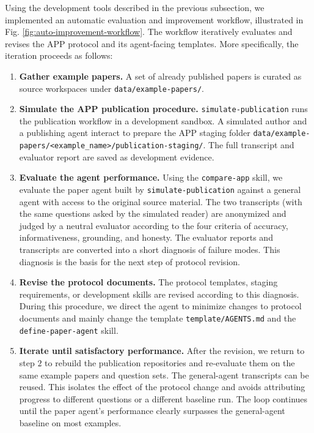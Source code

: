 \documentclass{article}
\begin{document}
Using the development tools described in the previous subsection, we implemented an automatic evaluation and improvement workflow, illustrated in Fig. \ref{fig:auto-improvement-workflow}. The workflow iteratively evaluates and revises the APP protocol and its agent-facing templates. More specifically, the iteration proceeds as follows:

\begin{enumerate}
    \item \textbf{Gather example papers.} A set of already published papers is curated as source workspaces under \texttt{data/example-papers/}. 
    \item \textbf{Simulate the APP publication procedure.} \texttt{simulate-publication} runs the publication workflow in a development sandbox. A simulated author and a publishing agent interact to prepare the APP staging folder \texttt{data/example-papers/<example\_name>/publication-staging/}. The full transcript and evaluator report are saved as development evidence.
    \item \textbf{Evaluate the agent performance.} Using the \texttt{compare-app} skill, we evaluate the paper agent built by \texttt{simulate-publication} against a general agent with access to the original source material. The two transcripts (with the same questions asked by the simulated reader) are anonymized and judged by a neutral evaluator according to the four criteria of accuracy, informativeness, grounding, and honesty. The evaluator reports and transcripts are converted into a short diagnosis of failure modes. This diagnosis is the basis for the next step of protocol revision.
    \item \textbf{Revise the protocol documents.} The protocol templates, staging requirements, or development skills are revised according to this diagnosis. During this procedure, we direct the agent to minimize changes to protocol documents and mainly change the template \texttt{template/AGENTS.md} and the \texttt{define-paper-agent} skill.
    \item \textbf{Iterate until satisfactory performance.} After the revision, we return to step $2$ to rebuild the publication repositories and re-evaluate them on the same example papers and question sets. The general-agent transcripts can be reused. This isolates the effect of the protocol change and avoids attributing progress to different questions or a different baseline run. The loop continues until the paper agent's performance clearly surpasses the general-agent baseline on most examples. 
\end{enumerate}
\end{document}
